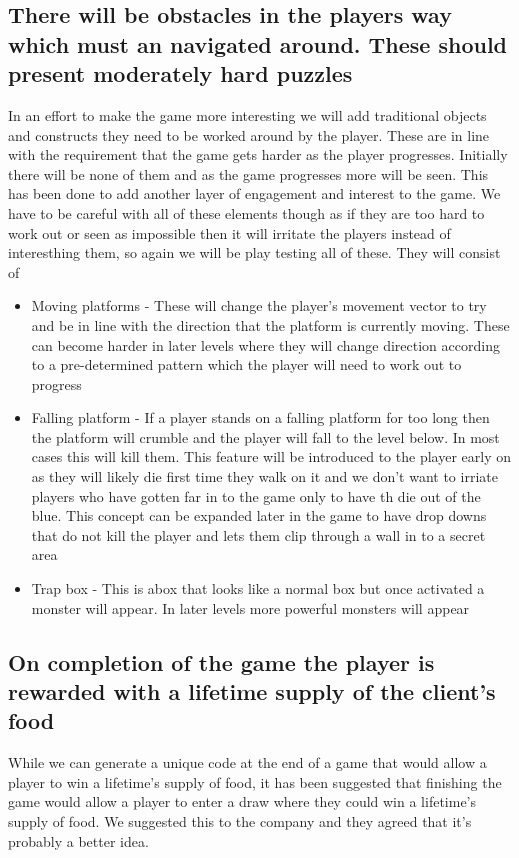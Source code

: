 \documentclass{article}
\begin{document}
\subsection{ There will be obstacles in the players way which must an navigated around. These should present moderately hard puzzles }
In an effort to make the game more interesting we will add traditional objects and constructs they need to be worked around by the player. These are in line with the requirement that the game gets harder as the player progresses. Initially there will be none of them and as the game progresses more will be seen. This has been done to add another layer of engagement and interest to the game. We have to be careful with all of these elements though as if they are too hard to work out or seen as impossible then it will irritate the players instead of interesthing them, so again we will be play testing all of these.
They will consist of
\begin{itemize}
\item Moving platforms - These will change the player's movement vector to try and be in line with the direction that the platform is currently moving. These can become harder in later levels where they will change direction according to a pre-determined pattern which the player will need to work out to progress
\item Falling platform - If a player stands on a falling platform for too long then the platform will crumble and the player will fall to the level below. In most cases this will kill them. This feature will be introduced to the player early on as they will likely die first time they walk on it and we don't want to irriate players who have gotten far in to the game only to have th die out of the blue. This concept can be expanded later in the game to have drop downs that do not kill the player and lets them clip through a wall in to a secret area
\item Trap box - This is abox that looks like a normal box but once activated a monster will appear. In later levels more powerful monsters will appear
\end{itemize}

\subsection{ On completion of the game the player is rewarded with a lifetime supply of the client's food }
While we can generate a unique code at the end of a game that would allow a player to win a lifetime's supply of food, it has been suggested that finishing the game would allow a player to enter a draw where they could win a lifetime's supply of food.
We suggested this to the company and they agreed that it's probably a better idea.



\end{document}
